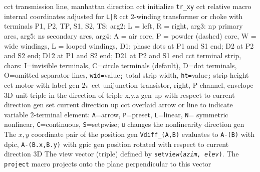   {cct}
  {transmission line, manhattan direction}
  {cct}
  {initialize {\tt tr\_xy}}
  {cct}
  {relative macro internal coordinates adjusted for {\tt L|R}}
  {cct}
  {2-winding transformer or choke with terminals P1, P2, TP, S1, S2, TS:
    arg2: L = left, R = right,
    arg3: np primary arcs,
    arg5: ns secondary arcs,
    arg4: A = air core, P = powder (dashed) core,
    W = wide windings, L = looped windings,
    D1: phase dots at P1 and S1 end; D2 at P2 and S2 end; D12 at P1 and S2 end;
    D21 at P2 and S1 end 
   }
  {cct}
  {terminal strip, chars:
   I=invisible terminals,
   C=circle terminals (default),
   D=dot terminals,
   O=omitted separator lines,
   {\tt wid=}value{\tt ;} total strip width,
   {\tt ht=}value{\tt ;} strip height
    }
  {cct}
  {motor with label}
  {gen}
  {$2\pi$}
  {cct}
  {unijunction transistor, right, P-channel, envelope
    }
  {3D}
  {unit triple in the direction of triple x,y,z}
  {gen}
  {up with respect to current direction}
  {gen}
  {set current direction up }
  {cct}
  {overlaid arrow or line to indicate variable 2-terminal element:
    {\tt A}=arrow, {\tt P}=preset,
    {\tt L}=linear,
    {\tt N}= symmetric nonlinear,
    {\tt C}=continuous, {\tt S}=setpwise; {\tt u} changes the
    nonlinearity direction
   }
  {gen}
  {The $x, y$ coordinate pair of the position}
  {gen}
  {{\tt Vdiff\_(A,B)} evaluates to {\tt A-(B)} with dpic, {\tt A-(B.x,B.y)}
   with gpic}
  {gen}
  {position rotated with respect to current direction}
  {3D}
  {The view vector (triple) defined by {\tt setview({\sl azim, elev})}. The
   {\tt project}
   macro projects onto the plane perpendicular to this vector}
